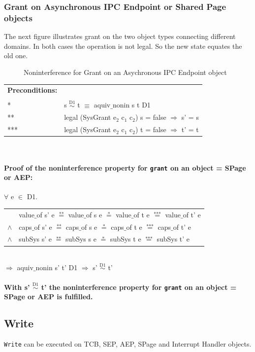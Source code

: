 \documentclass[11pt,a4paper,twoside]{article}
\begin{document}
{\subsubsection{Grant on Asynchronous IPC Endpoint or Shared Page objects}
The next figure illustrates grant on the two object types connecting different domains. In both cases the operation is not legal. So the new state equates the old one.
\begin{flushleft}
\begin{figure}[H]
\caption{Noninterference for Grant on an Asychronous IPC Endpoint object}
\end{figure}
\end{flushleft}
\begin{tabular}{ll}
\textbf{Preconditions:} \\ \\
* & s $\overset{\text{D1}}{\sim}$ t $\equiv$ aquiv$\_$nonin s t D1	\\ 
** & legal (SysGrant e$_2$ c$_1$ c$_2$) s = false $\Rightarrow$ s' = s \\ 
*** & legal (SysGrant e$_2$ c$_1$ c$_2$) t = false $\Rightarrow$ t' = t
\end{tabular}\\ \\ 
\textbf{Proof of the noninterference property for \texttt{grant} on an object = SPage or AEP:}\\ \\
$\forall$ e $\in$ D1. \\ 
\begin{tabular}{ll}
& value$\_$of s' e $\overset{\text{**}}{=}$ value$\_$of s e $\overset{\text{*}}{=}$ value$\_$of t e $\overset{\text{***}}{=}$ value$\_$of t' e \\
$\wedge$ & caps$\_$of s' e $\overset{\text{**}}{=}$ caps$\_$of s e $\overset{\text{*}}{=}$ caps$\_$of t e $\overset{\text{***}}{=}$ caps$\_$of t' e \\
$\wedge$ & subSys s' e $\overset{\text{**}}{=}$ subSys s e $\overset{\text{*}}{=}$ subSys t e $\overset{\text{***}}{=}$ subSys t' e
\end{tabular} \\
$\Rightarrow$ aquiv$\_$nonin s' t' D1 $\Rightarrow$ s' $\overset{\text{D1}}{\sim}$ t' \\ \\
\textbf{With s' $\overset{\text{D1}}{\sim}$ t' the noninterference property for \texttt{grant} on an object = SPage or AEP is fulfilled.} 
\clearpage
\subsection{Write}\label{Write}
\texttt{Write} can be executed on TCB, SEP, AEP, SPage and Interrupt Handler objects.
}
\end{document}
